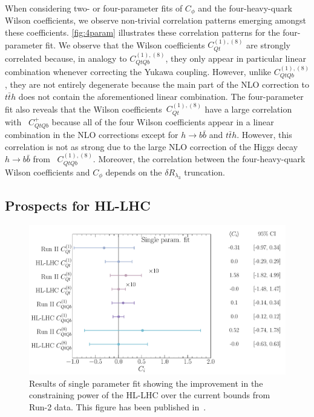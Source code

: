 \par	When considering two- or four-parameter fits of $C_\phi$ and the four-heavy-quark Wilson coefficients, we observe non-trivial correlation patterns emerging amongst these coefficients.  \autoref{fig:4param} illustrates these correlation patterns for the four-parameter fit. 
	We observe that the Wilson coefficients $C_{Qt}^{(1),(8) }$ are strongly correlated because, in analogy to $C_{QtQb}^{(1),(8) }$, they only appear in particular linear combination whenever correcting the Yukawa coupling. However,  unlike $C_{QtQb}^{(1),(8) }$, they are not entirely degenerate because the main part of the NLO correction to $t\bar t h$ does not contain the aforementioned linear combination.  The four-parameter fit also reveals that the Wilson coefficients~$C_{Qt}^{(1),(8) }$ have a large correlation with ~$C_{QtQb}^{+}$ because all of the four Wilson coefficients appear in a linear combination in the NLO corrections except for $ h\to b\bar b$ and $ t\bar{t} h$. However, this correlation is not as strong due to the large NLO correction of the Higgs decay $h \to b \bar b$ from ~$C_{QtQb}^{(1),(8) }$. Moreover, the correlation between the four-heavy-quark Wilson coefficients and $C_{\phi}$ depends on the $\delta R_{\lambda_3}$ truncation. 
	\subsection{Prospects for HL-LHC}
	\begin{figure}[t!]
		\begin{center}
			\includegraphics[width=0.75\linewidth]{fig/uebeblick_forest_ci}
		\end{center}
		\caption{ Results of single parameter fit showing the improvement in the constraining power of the HL-LHC over the current bounds from Run-2 data.  This figure has been published in~\cite{Alasfar:2022zyr}. \label{fig:HLLHC} }
	\end{figure}
	
